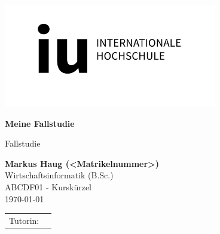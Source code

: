 \def\usesf{}
\let\usesf\sffamily %

\newsavebox{\Tutorin}


\setlength{\unitlength}{1pt}

\begin{titlepage}
\vspace{-39pt}\hspace*{300pt}\includegraphics[width=.21\paperwidth]{logos/IU.png}

\begin{center}
\hbox{}
\vfill
{\usesf}
{\huge\bfseries Meine Fallstudie \par}
\vskip 1.8cm
Fallstudie\\[2mm]
\vskip 1cm

{\large\bfseries Markus Haug (<Matrikelnummer>)\\}
\vskip 1.2cm
Wirtschaftsinformatik (B.Sc.)\\
ABCDF01 - Kurskürzel\\
\today %
\vskip 3cm
\begin{tabular}{p{3cm}l}
Tutorin: & \usebox{\Tutorin} \\
\end{tabular}
\vfill
\end{center}

\end{titlepage}


